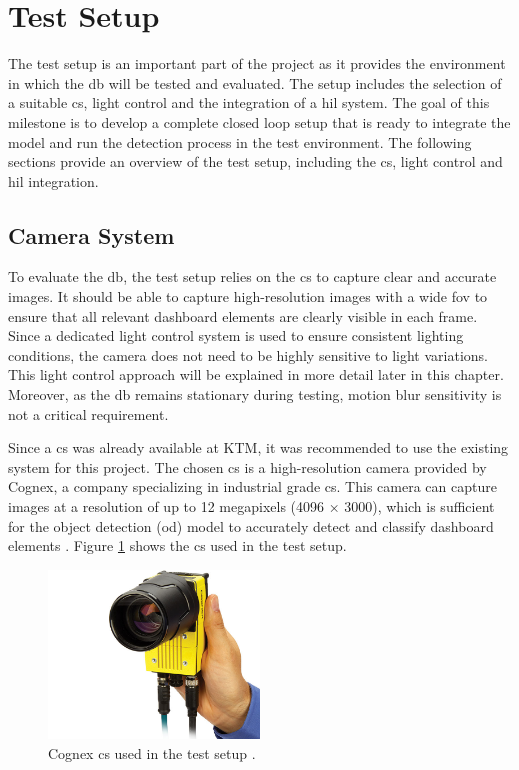 \section{Test Setup}
The test setup is an important part of the project as it provides the environment in which the \gls{db} will be tested and evaluated. The setup includes the selection of a suitable \gls{cs}, light control and the integration of a \gls{hil} system. The goal of this milestone is to develop a complete closed loop setup that is ready to integrate the model and run the detection process in the test environment. The following sections provide an overview of the test setup, including the \gls{cs}, light control and \gls{hil} integration.

\subsection{Camera System}
To evaluate the \gls{db}, the test setup relies on the \gls{cs} to capture clear and accurate images. It should be able to capture high-resolution images with a wide \gls{fov} to ensure that all relevant dashboard elements are clearly visible in each frame. Since a dedicated light control system is used to ensure consistent lighting conditions, the camera does not need to be highly sensitive to light variations. This light control approach will be explained in more detail later in this chapter. Moreover, as the \gls{db} remains stationary during testing, motion blur sensitivity is not a critical requirement.

Since a \gls{cs} was already available at KTM, it was recommended to use the existing system for this project. The chosen \gls{cs} is a high-resolution camera provided by Cognex, a company specializing in industrial grade \gls{cs}. This camera can capture images at a resolution of up to 12 megapixels (4096 × 3000), which is sufficient for the object detection (\gls{od}) model to accurately detect and classify dashboard elements \cite{Cognex_Camera}. Figure \ref{Cognex_Camera} shows the \gls{cs} used in the test setup.

\begin{figure}[!htb]
    \centering
    \includegraphics[width=0.5\textwidth]{Figures/In-Sight 9000 in hand.jpg}
    \caption{Cognex \gls{cs} used in the test setup \cite{Cognex_Camera}.}
    \label{Cognex_Camera}
\end{figure}


